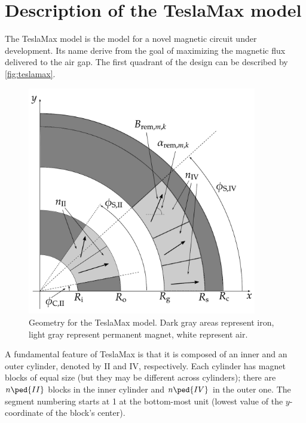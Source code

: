 \documentclass[article,brazil,english]{techreport}
\newcommand{\teslamax}{TeslaMax{ }}
\begin{document}
\frenchspacing 

\pretextual

\maketitle

\textual

\section{Description of the \teslamax model}
\label{sec:descr-tesl-model}

The \teslamax model is the model for a novel magnetic circuit under development. Its name derive from the goal of maximizing the magnetic flux delivered to the air gap. The first quadrant of the  design can be described by \autoref{fig:teslamax}. 

\begin{figure}[!ht]
  \centering
  \includegraphics[width=10cm]{teslamax.pdf}
  \caption{Geometry for the \teslamax model. Dark gray areas represent iron, light gray represent permanent magnet, white represent air.}
  \label{fig:teslamax}
\end{figure}

A fundamental feature of \teslamax is that it is composed of an inner and an outer cylinder, denoted by II and IV, respectively. Each cylinder has magnet blocks of equal size (but they may be different across cylinders); there are $n\ped{II}$ blocks in the inner cylinder and $n\ped{IV}$ in the outer one. The segment numbering starts at 1 at the bottom-most unit (lowest value of the $y$-coordinate of the block's center).
\end{document}
